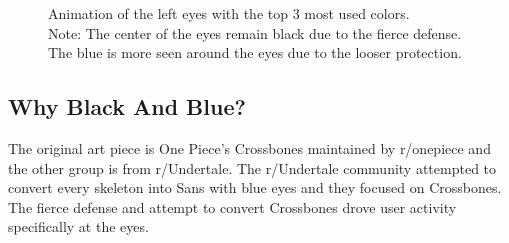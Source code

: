 \begin{figure}[H]%
    \centering
    \qquad
    \caption{Animation of the left eyes with the top 3 most used colors. \\ Note: The center of the eyes remain black due to the fierce defense. The blue is more seen around the eyes due to the looser protection.}
\end{figure}


\subsection{Why Black And Blue?}
The original art piece is One Piece's Crossbones maintained by r/onepiece and the other group is from r/Undertale. The r/Undertale community attempted to convert every skeleton into Sans with blue eyes and they focused on Crossbones. The fierce defense and attempt to convert Crossbones drove user activity specifically at the eyes.